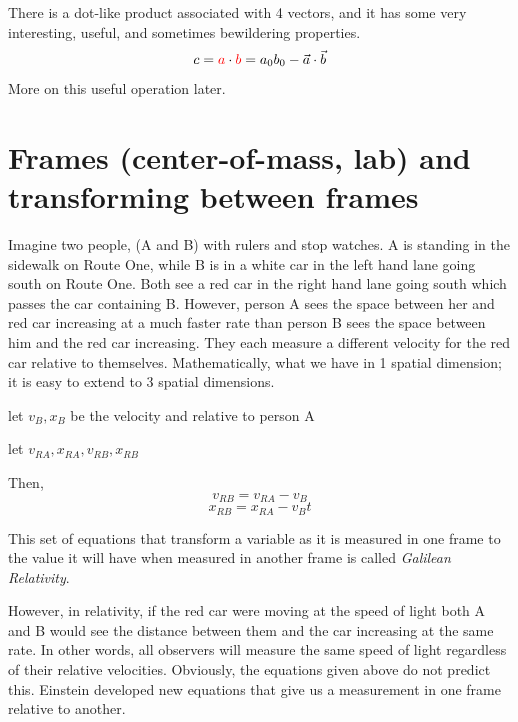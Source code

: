 There is a dot-like product associated with 4 vectors, and it has some very interesting, useful, and sometimes bewildering properties.
\begin{equation}
	    c ={\color{red}a} \cdot {\color{red}b} = a_0b_0 - \vec a \cdot \vec b
\end{equation}
More on this useful operation later.

\section{Frames (center-of-mass, lab) and transforming between frames}

Imagine two people, (A and B) with rulers and stop watches.  A is standing in the sidewalk on Route One, while B is in a white car in the left hand lane going south on Route One.  Both see a red car in the right hand lane going south which passes the car containing B.  However, person A sees the space between her and red car increasing at a much faster rate than person B sees the space between him and the red car increasing.  They each measure a different velocity for the red car relative to themselves.  Mathematically, what we have in 1 spatial dimension; it is easy to extend to 3 spatial dimensions.

\noindent let $v_B, x_B$ be the velocity and relative to person A 
       
\noindent let $v_{RA}, x_{RA},v_{RB}, x_{RB}$
	  

Then,
\begin{equation}
 v_{RB} = v_{RA} - v_B
\end{equation}
\begin{equation}
 x_{RB} = x_{RA} - v_B t
\end{equation}

\noindent This set of equations that transform a variable as it is measured in one frame to the value it will have when measured in another frame is called {\it Galilean Relativity}.


However, in relativity, if the red car were moving at the speed of light both A and B would see the distance between them and the car increasing at the same rate.  In other words, all observers will measure the same speed of light regardless of their relative velocities.  Obviously, the equations given above do not predict this.  Einstein developed new equations that give us a measurement in one frame relative to another.  


